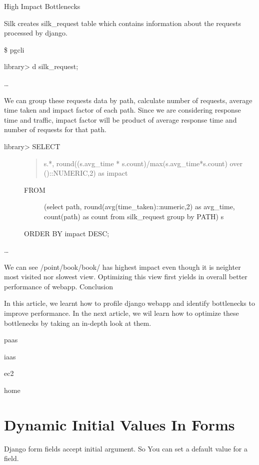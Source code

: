 \documentclass[letterpaper,11pt,english]{sphinxmanual}
\begin{document}
High Impact Bottlenecks

Silk creates silk\_request table which contains information about the requests processed by django.

\$ pgcli

library\textgreater{} d silk\_request;

…

We can group these requests data by path, calculate number of requests, average time taken and impact factor of each path. Since we are considering response time and traffic, impact factor will be product of average response time and number of requests for that path.
\begin{description}
\item[{library\textgreater{} SELECT}] \leavevmode\begin{quote}

s.*, round((s.avg\_time * s.count)/max(s.avg\_time*s.count) over ()::NUMERIC,2) as impact
\end{quote}
\begin{description}
\item[{FROM}] \leavevmode
(select path, round(avg(time\_taken)::numeric,2) as avg\_time, count(path) as count from silk\_request group by PATH)
s

\end{description}

ORDER BY impact DESC;

\end{description}

…

We can see /point/book/book/ has highest impact even though it is neighter most visited nor slowest view. Optimizing this view first yields in overall better performance of webapp.
Conclusion

In this article, we learnt how to profile django webapp and identify bottlenecks to improve performance. In the next article, we wil learn how to optimize these bottlenecks by taking an in-depth look at them.

paas

iaas

ec2

home


\chapter{Dynamic Initial Values In Forms}
\label{\detokenize{misc_gotcha_initial:dynamic-initial-values-in-forms}}\label{\detokenize{misc_gotcha_initial::doc}}
Django form fields accept initial argument. So You can set a default value for a field.
\end{document}
